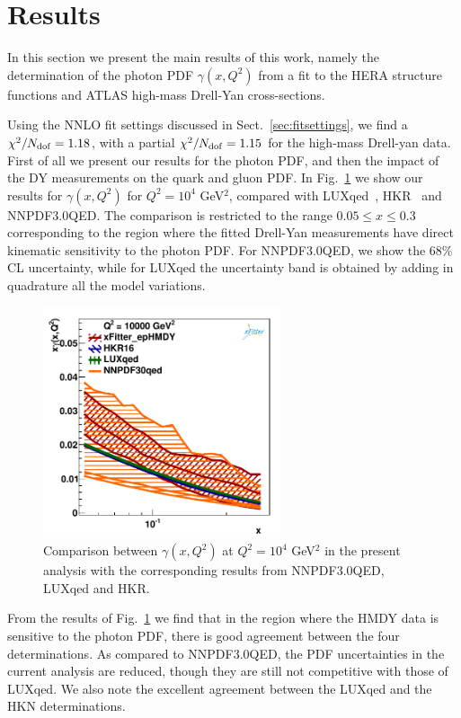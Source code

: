 \section{Results}
\label{sec:results}

In this section we present the main results of this work, namely the determination
of the photon PDF $\gamma(x,Q^2)$ from a fit to the HERA structure functions
and ATLAS high-mass Drell-Yan cross-sections.

Using the NNLO fit settings discussed in Sect.~\ref{sec:fitsettings}, we find
a $\chi^{2}/N_{\rm dof} = 1.18$,
with a partial $\chi^2/N_{\rm dof} = 1.15$ for the high-mass Drell-yan data.
%
First of all we present our results for the photon PDF, and then the impact
of the DY measurements on the quark and gluon PDF.
%
In Fig.~\ref{photon_zoom} we show our results
for $\gamma(x,Q^2)$ for $Q^2=10^4$ GeV$^2$,
compared with LUXqed~\cite{Manohar:2016nzj}, HKR~\cite{Harland-Lang:2016apc}
and NNPDF3.0QED.
%
The comparison is restricted to the range $0.05 \le x \le 0.3$ corresponding
to the region where the fitted Drell-Yan measurements have direct kinematic sensitivity
to the photon PDF.
%
For NNPDF3.0QED, we show the 68\% CL uncertainty, while for LUXqed the uncertainty band
is obtained by adding in quadrature all the model variations.

\begin{figure}[h]
\includegraphics[width=7cm]{plots/photon_comp_10000.pdf} 
\caption{Comparison between $\gamma(x,Q^2)$ at $Q^2=10^4$ GeV$^2$ in the present
  analysis with the corresponding results from NNPDF3.0QED, LUXqed and HKR.}
\label{photon_zoom}
\end{figure}

From the results of Fig.~\ref{photon_zoom} we find that in the region where the HMDY data is
sensitive to the photon PDF, there is good agreement between the four determinations.
%
As compared to NNPDF3.0QED, the PDF uncertainties in the current analysis are reduced, though
they are still not competitive with those of LUXqed.
%
We also note the excellent agreement between the LUXqed and the HKN determinations.

